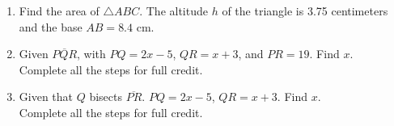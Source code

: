 \documentclass[12pt, twoside]{article}
\begin{document}
\begin{enumerate}
\item Find the area of $\triangle ABC$. The altitude $h$ of the triangle is 3.75 centimeters and the base $AB=8.4$ cm.\\[0.5cm]
 \vspace{1.0cm}


\item Given $\overline{PQR}$, with $PQ=2x-5$, $QR=x+3$, and $PR=19$. Find ${x}$.\\
Complete all the steps for full credit. \smallskip


\vspace{4cm}

\item Given that $Q$ bisects $\overline{PR}$. $PQ=2x-5$, $QR=x+3$. Find ${x}$.\\
Complete all the steps for full credit.

\end{enumerate}
\end{document}
